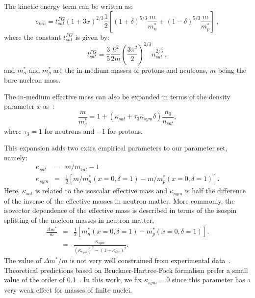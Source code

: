\documentclass
[aps,prc,twocolumn,showpacs,showkeys,amsmath,floatfix,superscriptaddress]{revtex4}
\begin{document}
The kinetic energy term can be written as:
\begin{equation}
 e_{kin} = t_{sat}^{FG} (1+3 x)^{2/3} \frac{1}{2} \left[ (1+\delta)^{5/3} \frac{m}{m_n^*} + (1-\delta)^{5/3}\frac{m}{m_p^*}  \right]~,
\end{equation}
where  the constant $t_{sat}^{FG}$ is given by:
\begin{equation}
 t_{sat}^{FG} = \frac{3}{5}\frac{\hbar^2}{2m} \left( \frac{3 \pi^2}{2} \right)^{2/3} n_{sat}^{2/3} ~,
\end{equation}
and $m_n^*$ and $m_p^*$ are the in-medium masses of protons and neutrons, $m$ being the bare nucleon mass. 
{The in-medium effective mass can also be expanded
in terms of the density parameter $x$ as~\cite{Casali1}:
\begin{equation}
\frac{m}{m^*_q} = 1+ \left( \kappa_{sat} + \tau_3 \kappa_{sym} \delta \right) \frac{n_0}{n_{sat}},
\label{eq:effm_expn}
\end{equation}
where $\tau_3=1$ for neutrons and $-1$ for protons.

This expansion adds two extra empirical parameters to our parameter set, namely:
\begin{eqnarray}
\kappa_{sat} &=& m/m_{sat} - 1 \nonumber \\
\kappa_{sym} &=& \frac{1}{2} [m/m_n^*(x=0,\delta=1)-m/m_p^*(x=0,\delta=1)]. 
\label{eq:effm_def}
\end{eqnarray}
 Here, $\kappa_{sat}$ is related to the isoscalar effective mass and $\kappa_{sym}$ is half the difference of the inverse of the effective masses in
 neutron matter.
 More commonly, the isovector dependence of the effective mass is described in terms of the isospin splitting of the nucleon masses in neutron matter,
\begin{eqnarray}
\frac{\Delta m^*}{m} &=& \frac{1}{2} [m_n^*(x=0,\delta=1)-m_p^*(x=0,\delta=1)]. \nonumber \\
&=& \frac{\kappa_{sym}}{(\kappa_{sym})^2-(1+\kappa_{sat})^2}.
\label{eq:effm_def}
\end{eqnarray}
The value of $\Delta m^*/m$ is not very well constrained from experimental data~\cite{Lesinski2006}. 
Theoretical predictions based on Bruckner-Hartree-Fock formalism prefer a small value of the order of 0.1~\cite{Lesinski2006}.
In this work, we fix $\kappa_{sym}=0$ since this parameter has a very weak effect for masses of finite nuclei.
} 
 
\end{document}
